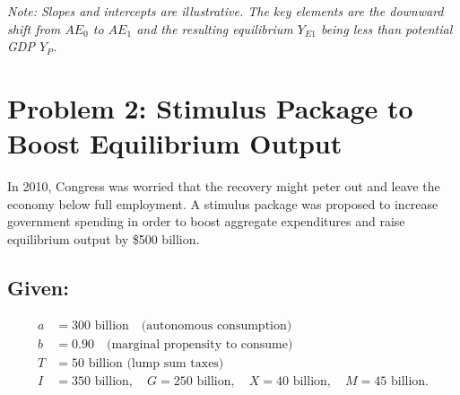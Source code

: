 \documentclass{article}
\begin{document}
\begin{center}
\end{center}
\textit{Note: Slopes and intercepts are illustrative. The key elements are the downward shift from \(AE_0\) to \(AE_1\) and the resulting equilibrium \(Y_{E1}\) being less than potential GDP \(Y_{P}\).}




\section*{Problem 2: Stimulus Package to Boost Equilibrium Output}
In 2010, Congress was worried that the recovery might peter out and leave the economy below full employment. A stimulus package was proposed to increase government spending in order to boost aggregate expenditures and raise equilibrium output by \$500 billion.

\subsection*{Given:}
\[
\begin{aligned}
a &= 300\text{ billion} \quad\text{(autonomous consumption)} \\
b &= 0.90\quad\text{(marginal propensity to consume)} \\
T &= 50\text{ billion (lump sum taxes)} \\
I &= 350\text{ billion}, \quad G=250\text{ billion}, \quad X=40\text{ billion}, \quad M=45\text{ billion.}
\end{aligned}
\]
\end{document}
